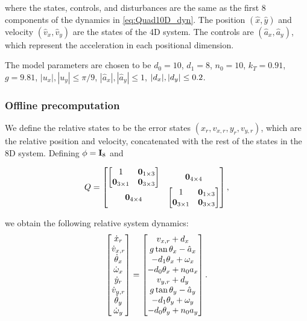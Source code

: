 \noindent where the states, controls, and disturbances are the same as the first 8 components of the dynamics in \eqref{eq:Quad10D_dyn}. 
The position $(\hat x,\hat y)$ and velocity $(\hat v_x, \hat v_y)$ are the states of the 4D system. 
The controls are $(\hat a_x, \hat a_y)$, which represent the acceleration in each positional dimension. 

The model parameters are chosen to be $d_0=10$, $d_1=8$, $n_0=10$, $k_T=0.91$, $g=9.81$, $|u_x|, |u_y| \le \pi/9$, $|\hat a_x|, |\hat a_y| \le 1$, $|d_x|, |d_y| \le 0.2$.

\subsubsection{Offline precomputation}
We define the relative states to be the error states $(x_r, v_{x,r}, y_r, v_{y,r})$, which are the relative position and velocity, concatenated with the rest of the states in the 8D system.
Defining $\phi = \mathbf I_8$ and 

\begin{equation*}
Q = 
\begin{bmatrix}
  \begin{bmatrix}
    1 & \mathbf 0_{1 \times 3} \\
    \mathbf 0_{3 \times 1} & \mathbf 0_{3 \times 3}
  \end{bmatrix} & \mathbf 0_{4\times 4} \\
  \mathbf 0_{4\times 4} & \begin{bmatrix}
    1 & \mathbf 0_{1 \times 3} \\
    \mathbf 0_{3 \times 1} & \mathbf 0_{3 \times 3}
  \end{bmatrix} 
\end{bmatrix},
\end{equation*}

\noindent we obtain the following relative system dynamics:
\begin{equation}
\label{eq:Quad8DRel_dyn}
\begin{bmatrix}
\dot x_r\\
\dot v_{x,r}\\
\dot \theta_x\\
\dot \omega_x\\
\dot y_r\\
\dot v_{y,r}\\
\dot \theta_y\\
\dot \omega_y\\
\end{bmatrix} =
\begin{bmatrix}
v_{x,r} + \dstb_x\\
g \tan \theta_x - \hat a_x\\
-d_1 \theta_x + \omega_x\\
-d_0 \theta_x + n_0 a_x\\
v_{y,r} + \dstb_y\\
g \tan \theta_y - \hat a_y\\
-d_1 \theta_y + \omega_y\\
-d_0 \theta_y + n_0 a_y\\
\end{bmatrix}.
\end{equation}

